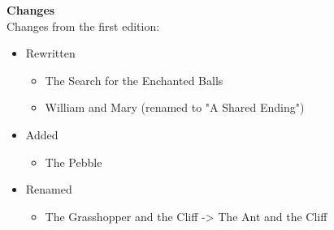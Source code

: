 \huge \textbf{Changes}\\

\large
Changes from the first edition:\\
\begin{itemize}
	\item Rewritten
	\begin{itemize}
		\item The Search for the Enchanted Balls
		\item William and Mary (renamed to "A Shared Ending")
	\end{itemize}
	\item Added
	\begin{itemize}
		\item The Pebble
	\end{itemize}
	\item Renamed
	\begin{itemize}
		\item The Grasshopper and the Cliff -> The Ant and the Cliff
	\end{itemize}
\end{itemize}